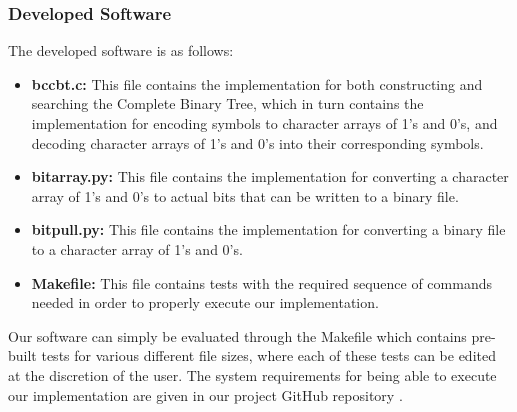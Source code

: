 \documentclass[12pt]{IEEEtran}
\begin{document}
\subsubsection{Developed Software}
The developed software is as follows:
\begin{itemize}
\item \textbf{bccbt.c:} This file contains the implementation for both constructing and searching the Complete Binary Tree,
which in turn contains the implementation for encoding symbols to character arrays of 1's and 0's,
and decoding character arrays of 1's and 0's into their corresponding symbols.
\item \textbf{bitarray.py:} This file contains the implementation for converting a character array of 1's and 0's
to actual bits that can be written to a binary file.
\item \textbf{bitpull.py:} This file contains the implementation for converting a binary file to a character
array of 1's and 0's.
\item \textbf{Makefile:} This file contains tests with the required sequence of commands needed
in order to properly execute our implementation.
\end{itemize}
Our software can simply be evaluated through the Makefile which contains pre-built tests for various different file sizes,
where each of these tests can be edited at the discretion of the user. The system requirements for being able to execute our
implementation are given in our project GitHub repository \cite{}.
\end{document}
